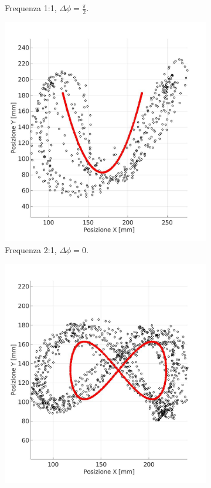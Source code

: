 \documentclass[12pt,twoside,openright]{report}
\begin{document}
\begin{figure}[h!]
\begin{subfigure}{0.49\textwidth}
    \caption{Frequenza 1:1, $\Delta \phi= \frac{\pi}{2}$.}
    \label{fig:c1}
    \vspace*{10mm}
\end{subfigure}
\hfill
\begin{subfigure}{0.49\textwidth}
    \includegraphics[width=\textwidth]{un.jpg}
    \caption{Frequenza 2:1, $\Delta \phi= 0$.}
    \label{fig:u1}
\end{subfigure}
\hfill
\begin{subfigure}{0.49\textwidth}
    \includegraphics[width=\textwidth]{in.jpg}

\end{subfigure}
\end{figure}
\end{document}
